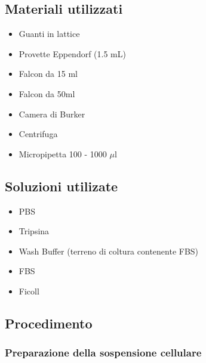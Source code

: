 \subsection{Materiali utilizzati}

\begin{itemize}
\item Guanti in lattice
\item Provette Eppendorf (1.5 mL)
\item Falcon da 15 ml
\item Falcon da 50ml
\item Camera di Burker
\item Centrifuga
\item Micropipetta 100 - 1000 $\mu$l

\end{itemize}


\subsection{Soluzioni utilizate}

\begin{itemize}

\item PBS
\item Tripsina
\item Wash Buffer (terreno di coltura contenente FBS)
\item FBS
\item Ficoll

\end{itemize}



\subsection{Procedimento}

\subsubsection{Preparazione della sospensione cellulare}

